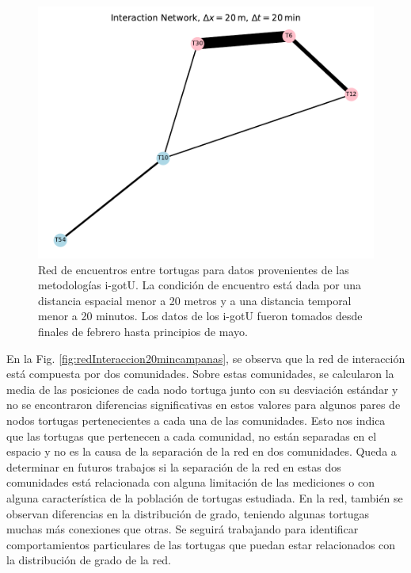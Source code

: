 \begin{figure}[ht]
    \begin{center}
       
   
    \includegraphics[width=\imsize]{Chap2/red_interaccion_20min_IGOTO.pdf}
\end{center}
    \caption[Red de encuentros entre tortugas utilizando i-gotU.]{Red de encuentros entre tortugas para datos provenientes de las metodologías i-gotU. La condición de encuentro está dada por una distancia espacial menor a 20 metros y a una distancia temporal menor a 20 minutos. Los datos de los i-gotU fueron tomados desde finales de febrero hasta principios de mayo.}
    \label{fig:redInteraccion20igotu}
\end{figure}
 
 
En la Fig. \ref{fig:redInteraccion20mincampanas}, se observa que la red de interacción está compuesta por dos comunidades. Sobre estas comunidades, se calcularon la media de las posiciones de cada nodo tortuga junto con su desviación estándar y no se encontraron diferencias significativas en estos valores para algunos pares de nodos tortugas pertenecientes a cada una de las comunidades. Esto nos indica que las tortugas que pertenecen a cada comunidad, no están separadas en el espacio y no es la causa de la separación de la red en dos comunidades. Queda a determinar en futuros trabajos si la separación de la red en estas dos comunidades está relacionada con alguna limitación de las mediciones o con alguna característica de la población de tortugas estudiada. En la red, también se observan diferencias en la distribución de grado, teniendo algunas tortugas muchas más conexiones que otras. Se seguirá trabajando para identificar comportamientos particulares de las tortugas que puedan estar relacionados con la distribución de grado de la red.
 
